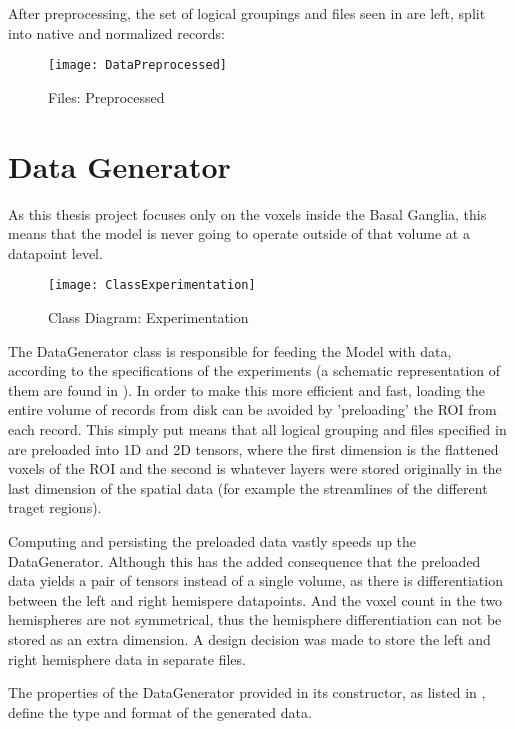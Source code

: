 After preprocessing, the set of logical groupings and files seen in  are left, split into native and normalized records:

\begin{figure}[H]
\centering
\texttt{[image: DataPreprocessed]}
\caption{Files: Preprocessed}
\label{fig:files}
\end{figure}

\section{Data Generator}

As this thesis project focuses only on the voxels inside the Basal Ganglia, this means that the model is never going to operate outside of that volume at a datapoint level.

\begin{figure}[H]
\centering
\texttt{[image: ClassExperimentation]}
\caption{Class Diagram: Experimentation}
\label{fig:digclsexp}
\end{figure}

The DataGenerator class is responsible for feeding the Model with data, according to the specifications of the experiments (a schematic representation of them are found in ). In order to make this more efficient and fast, loading the entire volume of records from disk can be avoided by 'preloading' the \ac{ROI} from each record. This simply put means that all logical grouping and files specified in  are preloaded into 1D and 2D tensors, where the first dimension is the flattened voxels of the \ac{ROI} and the second is whatever layers were stored originally in the last dimension of the spatial data (for example the streamlines of the different traget regions).\par
Computing and persisting the preloaded data vastly speeds up the DataGenerator. Although this has the added consequence that the preloaded data yields a pair of tensors instead of a single volume, as there is differentiation between the left and right hemispere datapoints. And the voxel count in the two hemispheres are not symmetrical, thus the hemisphere differentiation can not be stored as an extra dimension. A design decision was made to store the left and right hemisphere data in separate files.\par
The properties of the DataGenerator provided in its constructor, as listed in , define the type and format of the generated data.

